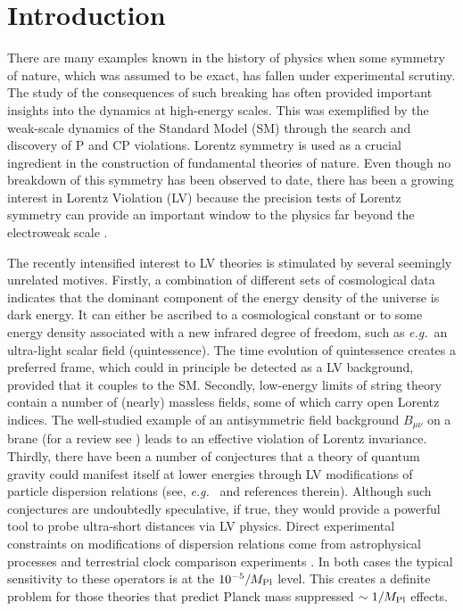 \documentclass[12pt]{revtex4}
\begin{document}
\begin{titlepage}
\end{titlepage}


\newpage

\setcounter{footnote}{0}
\setcounter{equation}{0}


\section{Introduction}
\label{Intro}


There are many examples known in the history of physics when some
symmetry of nature, which was assumed to be exact, has fallen under
experimental scrutiny. The study of the consequences of such breaking
has often provided important insights into the dynamics at
high-energy scales. This was exemplified by the weak-scale dynamics of
the Standard Model (SM) through the search and discovery of P and CP 
violations. Lorentz symmetry is used as a crucial ingredient in the
construction of fundamental theories of nature. Even though no
breakdown of this symmetry has been observed to date, there has been a
growing interest in Lorentz Violation (LV) because the precision 
tests of Lorentz symmetry can provide an important window to the
physics far beyond the electroweak scale
\cite{Kost1,CG,Jacobsonreview,PhysToday,Sigl:2004cq,Mattingly:2005re}. 


The recently intensified interest to LV theories is stimulated by
several seemingly unrelated motives. Firstly, a combination of different sets of 
cosmological data indicates that the dominant component of the energy
density of the universe is dark energy. It can either be ascribed
to a cosmological constant or to some energy density associated with a
new infrared degree of freedom, such as {\em e.g.}\ an ultra-light
scalar field (quintessence). The time evolution of quintessence
creates a preferred frame, which could in principle be detected as a
LV background, provided that it couples to the SM. Secondly, low-energy
limits of string theory contain a number of (nearly) massless fields,
some of which carry open Lorentz indices. The well-studied 
example of an antisymmetric field background $B_{\mu\nu}$ on a brane
(for a review see \cite{DN}) leads to an effective violation of Lorentz
invariance. Thirdly, there have been a number of conjectures that a
theory of quantum gravity could manifest itself at lower energies
through LV modifications of particle dispersion relations 
(see, {\em e.g.}\ \cite{lcq,Vucetich:2005ra} and references
therein). Although such 
conjectures are undoubtedly speculative, if true, they would provide a
powerful tool to probe ultra-short distances via LV physics.  Direct
experimental constraints on modifications of dispersion relations come
from astrophysical processes \cite{CFJ,AmC,Ted1,GK,Kost2,Bertolami:1999da,Sarkar,Bertolami:2003qs} and
terrestrial clock comparison experiments \cite{clock1,clock2,Vuc,MP:}. 
In both cases the typical sensitivity to these operators is at the
$10^{-5}/M_{\rm Pl}$ level. This creates a definite problem for those
theories that predict Planck mass suppressed $\sim 1/M_{\rm Pl}$
effects. 
\end{document}
